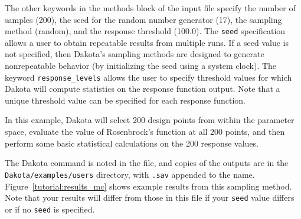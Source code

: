The other keywords in the methods block of the input file
specify the number of samples (200), the seed for the random number
generator (17), the sampling method (random), and the response
threshold (100.0). The \texttt{seed} specification allows a user to
obtain repeatable results from multiple runs. If a seed value is not
specified, then Dakota's sampling methods are designed to generate
nonrepeatable behavior (by initializing the seed using a system
clock). The keyword \texttt{response\_levels} allows the user to
specify threshold values for which Dakota will compute statistics on
the response function output. Note that a unique threshold value can
be specified for each response function.

In this example, Dakota will select 200 design points from within the
parameter space, evaluate the value of Rosenbrock's function at all
200 points, and then perform some basic statistical calculations on
the 200 response values.

The Dakota command is noted in the file, and copies of the outputs
are in the \texttt{Dakota/examples/users} directory, with \texttt{.sav} 
appended to the name.  
Figure~\ref{tutorial:results_mc} shows example results from this 
sampling method. 
Note that your results will differ from those in
this file if your \texttt{seed} value differs or if no \texttt{seed}
is specified.

